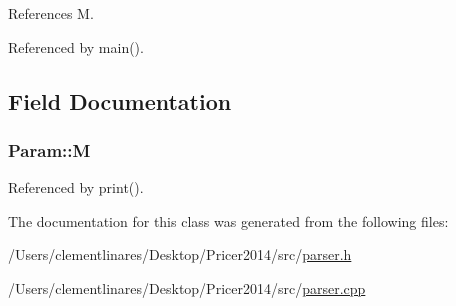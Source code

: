 References M.



Referenced by main().



\subsection{Field Documentation}
\hypertarget{classParam_ab671c1688f5247604d23ed990c90fd36}{
\subsubsection[{M}]{ Param\-::\-M}}\label{classParam_ab671c1688f5247604d23ed990c90fd36}


Referenced by print().



The documentation for this class was generated from the following files\-:\begin{DoxyCompactItemize}
\item 
/\-Users/clementlinares/\-Desktop/\-Pricer2014/src/\hyperlink{parser_8h}{parser.\-h}\item 
/\-Users/clementlinares/\-Desktop/\-Pricer2014/src/\hyperlink{parser_8cpp}{parser.\-cpp}\end{DoxyCompactItemize}
